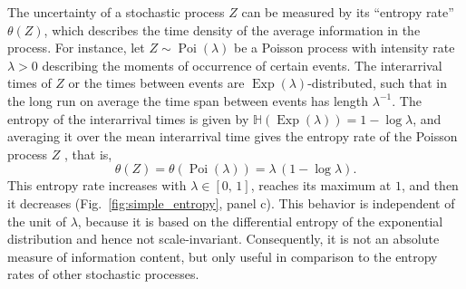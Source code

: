 \documentclass[smallextended]{svjour3}
\renewcommand{\H}{\mathbb{H}}
\newcommand{\Exp}{\operatorname{Exp}}
\newcommand{\Poi}{\operatorname{Poi}}
\newcommand{\ie}{that is}
\renewcommand{\emph}[1]{``#1''}
\providecommand{\DIFdelend}{} %
\DeclareRobustCommand{\DIFdelend}{\DIFOaddend \let\includegraphics\DIFOincludegraphics} %
\begin{document}
\DIFdelend The uncertainty of a stochastic process $Z$ can be measured by its \emph{entropy rate} $\theta(Z)$, which describes the time density of the average information in the process.
For instance, let $Z\sim\Poi(\lambda)$ be a Poisson process with intensity rate $\lambda>0$ describing the moments of occurrence of certain events.
The interarrival times of $Z$ or the times between events are $\Exp(\lambda)$-distributed, such that in the long run on average the time span between events has length $\lambda^{-1}$.
The entropy of the interarrival times is given by $\H(\Exp(\lambda))=1-\log \lambda$, and averaging it over the mean interarrival time gives the entropy rate of the Poisson process $Z$ \citep[Sect.~3.3]{Gaspard1993PR}, \ie,
\begin{equation}
  \theta(Z) = \theta(\Poi(\lambda)) = \lambda\,(1-\log \lambda).
\end{equation}
This entropy rate increases with $\lambda\in[0,\,1]$, reaches its maximum at $1$, and then it decreases (Fig.~\ref{fig:simple_entropy}, panel c).
This behavior is independent of the unit of $\lambda$, because it is based on the differential entropy of the exponential distribution and hence not scale-invariant.
Consequently, it is not an absolute measure of information content, but only useful in comparison to the entropy rates of other stochastic processes.
\end{document}
